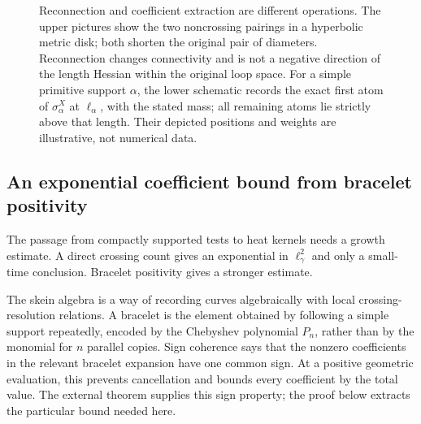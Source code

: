 \begin{figure}[htbp]
\caption[Crossing resolution and the first coefficient atom]{Reconnection and coefficient extraction are different operations.
The upper pictures show the two noncrossing pairings in a hyperbolic
metric disk; both shorten the original pair of diameters. Reconnection
changes connectivity and is not a negative direction of the length
Hessian within the original loop space. For a simple primitive support
$\alpha$, the lower schematic records the exact first atom of
$\sigma_\alpha^X$ at $\ell_\alpha$, with the stated mass; all remaining
atoms lie strictly above that length. Their depicted positions and
weights are illustrative, not numerical data.}
\label{fig:mono-reconnection-atoms}
\end{figure}

\subsection{An exponential coefficient bound from bracelet positivity}

The passage from compactly supported tests to heat kernels needs a
growth estimate. A direct crossing count gives an exponential in
$\ell_\gamma^2$ and only a small-time conclusion. Bracelet
positivity gives a stronger estimate.

The skein algebra is a way of recording curves algebraically with
local crossing-resolution relations. A bracelet is the element
obtained by following a simple support repeatedly, encoded by the
Chebyshev polynomial $P_n$, rather than by the monomial for $n$
parallel copies. Sign coherence says that the nonzero coefficients
in the relevant bracelet expansion have one common sign. At a
positive geometric evaluation, this prevents cancellation and
bounds every coefficient by the total value. The external theorem
supplies this sign property; the proof below extracts the particular
bound needed here.

